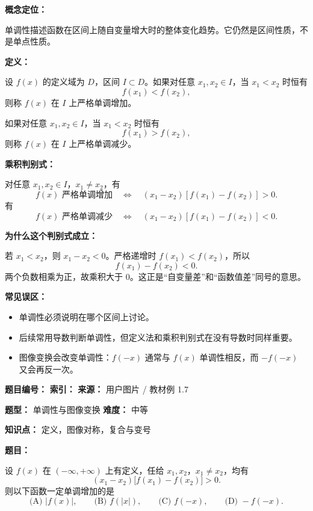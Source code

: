 \par

\begin{knowledgeBox}
\textbf{概念定位：}

单调性描述函数在区间上随自变量增大时的整体变化趋势。它仍然是区间性质，不是单点性质。

\textbf{定义：}

设 \(f(x)\) 的定义域为 \(D\)，区间 \(I\subset D\)。如果对任意 \(x_1,x_2\in I\)，当 \(x_1<x_2\) 时恒有
\[
f(x_1)<f(x_2),
\]
则称 \(f(x)\) 在 \(I\) 上严格单调增加。

如果对任意 \(x_1,x_2\in I\)，当 \(x_1<x_2\) 时恒有
\[
f(x_1)>f(x_2),
\]
则称 \(f(x)\) 在 \(I\) 上严格单调减少。

\textbf{乘积判别式：}

对任意 \(x_1,x_2\in I\)，\(x_1\ne x_2\)，有
\[
f(x)\text{ 严格单调增加}
\quad\Longleftrightarrow\quad
(x_1-x_2)[f(x_1)-f(x_2)]>0.
\]
有
\[
f(x)\text{ 严格单调减少}
\quad\Longleftrightarrow\quad
(x_1-x_2)[f(x_1)-f(x_2)]<0.
\]

\textbf{为什么这个判别式成立：}

若 \(x_1<x_2\)，则 \(x_1-x_2<0\)。严格递增时 \(f(x_1)<f(x_2)\)，所以
\[
f(x_1)-f(x_2)<0.
\]
两个负数相乘为正，故乘积大于 \(0\)。这正是“自变量差”和“函数值差”同号的意思。

\textbf{常见误区：}

\begin{itemize}
  \item 单调性必须说明在哪个区间上讨论。
  \item 后续常用导数判断单调性，但定义法和乘积判别式在没有导数时同样重要。
  \item 图像变换会改变单调性：\(f(-x)\) 通常与 \(f(x)\) 单调性相反，而 \(-f(-x)\) 又会再反一次。
\end{itemize}
\end{knowledgeBox}

\begin{problemBox}
\begin{problemMeta}
\textbf{题目编号：}  \quad
\textbf{索引：}  \quad
\textbf{来源：} 用户图片 / 教材例 1.7

\textbf{题型：} 单调性与图像变换 \quad
\textbf{难度：} 中等

\textbf{知识点：} 定义，图像对称，复合与变号
\end{problemMeta}

\textbf{题目：}

设 \(f(x)\) 在 \((-\infty,+\infty)\) 上有定义，任给 \(x_1,x_2\)，\(x_1\ne x_2\)，均有
\[
(x_1-x_2)\bigl[f(x_1)-f(x_2)\bigr]>0.
\]
则以下函数一定单调增加的是
\[
\text{(A) } |f(x)|,\qquad
\text{(B) } f(|x|),\qquad
\text{(C) } f(-x),\qquad
\text{(D) } -f(-x).
\]
\end{problemBox}

